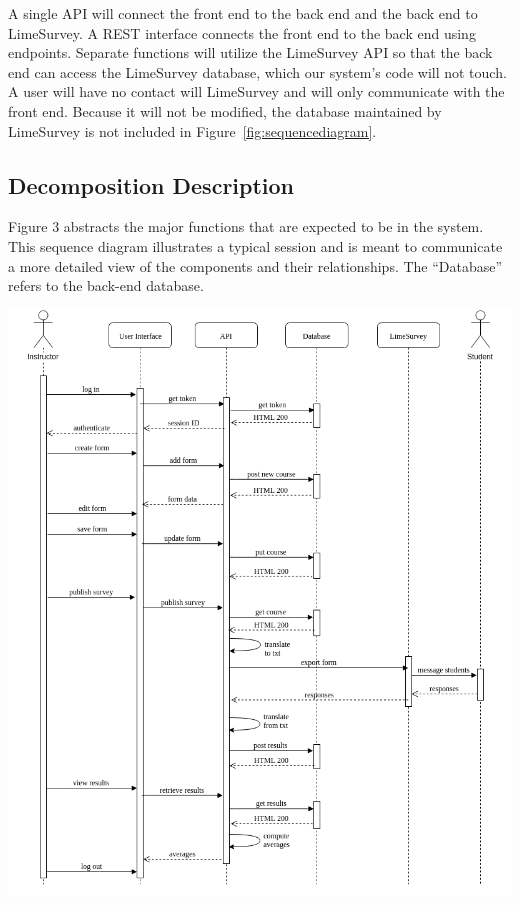 \documentclass{article}
\begin{document}
A single API will connect the front end to the back end and the back end to LimeSurvey. A REST interface connects the front end to the back end using endpoints. Separate functions will utilize the LimeSurvey API so that the back end can access the LimeSurvey database, which our system's code will not touch. A user will have no contact will LimeSurvey and will only communicate with the front end. Because it will not be modified, the database maintained by LimeSurvey is not included in Figure~\ref{fig:sequencediagram}. 

\subsection{Decomposition Description}

Figure 3 abstracts the major functions that are expected to be in the system. This sequence diagram illustrates a typical session and is meant to communicate a more detailed view of the components and their relationships. The ``Database'' refers to the back-end database.

\newpage

\begin{center}
\label{fig:sequencediagram}
{\includegraphics[scale=.77]{images/sequence_diagram.png}}
\end{center}
\end{document}
